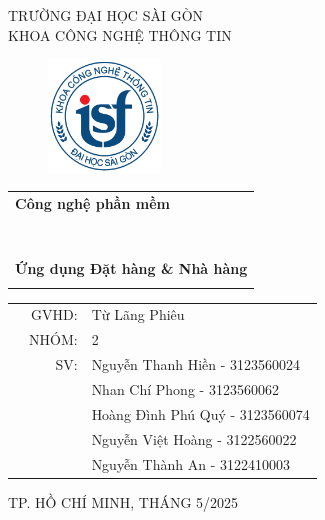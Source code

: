 \documentclass[a4paper]{article}
\begin{document}
\begin{titlepage}
\begin{center}
TRƯỜNG ĐẠI HỌC SÀI GÒN \\
KHOA CÔNG NGHỆ THÔNG TIN
\end{center}
\vspace{1cm}

\begin{figure}[h!]
\begin{center}
\includegraphics[width=3cm]{logoITSGU.png}
\end{center}
\end{figure}

\vspace{1cm}


\begin{center}
\begin{tabular}{c}
	\multicolumn{1}{l}{\textbf{{\Large Công nghệ phần mềm}}}\\
	~~\\
	\hline
	\\
	\multicolumn{1}{l}{\textbf{{\Large  }}}\\
	\\
	
	\textbf{{\Huge Ứng dụng Đặt hàng \& Nhà hàng}}\\
	\\
	\hline
\end{tabular}
\end{center}

\vspace{3cm}

\begin{table}[h]
\begin{tabular}{rrl}
\hspace{5 cm} & GVHD: &Từ Lãng Phiêu\\
\hspace{5 cm} & NHÓM: &2\\
& SV: & Nguyễn Thanh Hiền - 3123560024 \\
& & Nhan Chí Phong - 3123560062 \\
& & Hoàng Đình Phú Quý - 3123560074 \\
& & Nguyễn Việt Hoàng - 3122560022 \\
& & Nguyễn Thành An - 3122410003 \\

\end{tabular}
\vspace{1.5 cm}
\end{table}

\begin{center}

{\footnotesize TP. HỒ CHÍ MINH, THÁNG 5/2025}
\end{center}
\end{titlepage}
\end{document}
